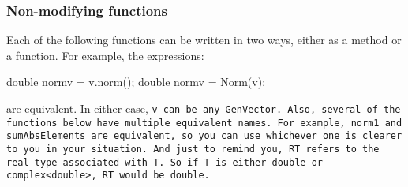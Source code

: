 \subsubsection{Non-modifying functions}

Each of the following functions can be written in two ways, either as a method or a function.
For example, the expressions:
\begin{tmvcode}
double normv = v.norm();
double normv = Norm(v);
\end{tmvcode}
are equivalent.  In either case, \tt{v} can be any \tt{GenVector}.
Also, several of the functions below have multiple equivalent names.  For example,
\tt{norm1} and \tt{sumAbsElements} are equivalent, so you can use whichever one is
clearer to you in your situation.  And just to remind you, \tt{RT} refers to the 
real type associated with \tt{T}.  So if \tt{T} is either \tt{double} or \tt{complex<double>},
\tt{RT} would be \tt{double}.

